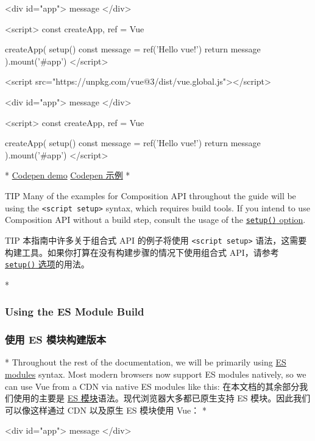 \begin{paracol}{2}
\begin{codeHtml}
<div id="app">{{ message }}</div>

<script>
    const { createApp, ref } = Vue

    createApp({
    setup() {
        const message = ref('Hello vue!')
        return {
        message
        }
    }
    }).mount('#app')
</script>
\end{codeHtml}  
\switchcolumn
\begin{codeHtml}
<script src="https://unpkg.com/vue@3/dist/vue.global.js"></script>

<div id="app">{{ message }}</div>

<script>
    const { createApp, ref } = Vue

    createApp({
    setup() {
        const message = ref('Hello vue!')
        return {
        message
        }
    }
    }).mount('#app')
</script>
\end{codeHtml}
\switchcolumn[0]*%
\href{https://codepen.io/vuejs-examples/pen/eYQpQEG}{Codepen demo}
\switchcolumn
\href{https://codepen.io/vuejs-examples/pen/eYQpQEG}{Codepen 示例}
\switchcolumn[0]*%
\begin{vueQuote}{TIP}
Many of the examples for Composition API throughout the guide will be
using the \texttt{\textless{}script\ setup\textgreater{}} syntax, which
requires build tools. If you intend to use Composition API without a
build step, consult the usage of the
\href{https://vuejs.org/api/composition-api-setup.html}{\texttt{setup()}
option}.
\end{vueQuote}
\switchcolumn
\begin{vueQuote}{TIP}
本指南中许多关于组合式 API 的例子将使用
\texttt{\textless{}script\ setup\textgreater{}}
语法，这需要构建工具。如果你打算在没有构建步骤的情况下使用组合式
API，请参考
\href{https://cn.vuejs.org/api/composition-api-setup.html}{\texttt{setup()}
选项}的用法。
\end{vueQuote}
\switchcolumn[0]*%
\subsubsection{Using the ES Module Build}
\switchcolumn
\subsubsection{使用 ES 模块构建版本}
\switchcolumn[0]*%
Throughout the rest of the documentation, we will be primarily using
\href{https://developer.mozilla.org/en-US/docs/Web/JavaScript/Guide/Modules}{ES
modules} syntax. Most modern browsers now support ES modules natively,
so we can use Vue from a CDN via native ES modules like this:
\switchcolumn
在本文档的其余部分我们使用的主要是
\href{https://developer.mozilla.org/zh-CN/docs/Web/JavaScript/Guide/Modules}{ES
模块}语法。现代浏览器大多都已原生支持 ES 模块。因此我们可以像这样通过
CDN 以及原生 ES 模块使用 Vue：
\switchcolumn[0]*%
\begin{codeHtml}
<div id="app">{{ message }}</div>


\end{codeHtml}
\end{paracol}
